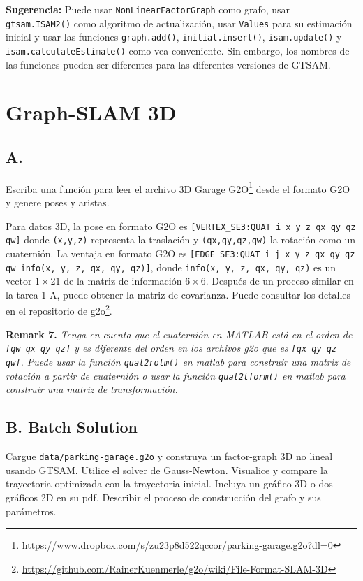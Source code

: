 \documentclass[tp]{lcc}
\begin{document}
\textbf{Sugerencia:} Puede usar \lstinline[style=bash]{NonLinearFactorGraph} como grafo, usar \lstinline[style=bash]{gtsam.ISAM2()} como algoritmo de actualización, usar \lstinline[style=bash]{Values} para su estimación inicial y usar las funciones \lstinline[style=bash]{graph.add()}, \lstinline[style=bash]{initial.insert()}, \lstinline[style=bash]{isam.update()} y \lstinline[style=bash]{isam.calculateEstimate()} como vea conveniente. Sin embargo, los nombres de las funciones pueden ser diferentes para las diferentes versiones de GTSAM.

\section{Graph-SLAM 3D}
\subsection{A.}
Escriba una función para leer el archivo 3D Garage G2O\footnote{\url{https://www.dropbox.com/s/zu23p8d522qccor/parking-garage.g2o?dl=0}} desde el formato G2O y genere poses y aristas.

Para datos 3D, la pose en formato G2O es \lstinline[style=bash]{[VERTEX_SE3:QUAT i x y z qx qy qz qw]} donde \lstinline[style=bash]{(x,y,z)} representa la traslación y \lstinline[style=bash]{(qx,qy,qz,qw)} la rotación como un cuaternión. La ventaja en formato G2O es \lstinline[style=bash]{[EDGE_SE3:QUAT i j x y z qx qy qz qw info(x, y, z, qx, qy, qz)]}, donde \lstinline[style=bash]{info(x, y, z, qx, qy, qz)} es un vector $1 \times 21$ de la matriz de información $6 \times 6$. Después de un proceso similar en la tarea 1 A, puede obtener la matriz de covarianza. Puede consultar los detalles en el repositorio de g2o\footnote{\url{https://github.com/RainerKuenmerle/g2o/wiki/File-Format-SLAM-3D}}.

\textbf{Remark 7.} \textit{Tenga en cuenta que el cuaternión en MATLAB está en el orden de \lstinline[style=bash]{[qw qx qy qz]} y es diferente del orden en los archivos g2o que es \lstinline[style=bash]{[qx qy qz qw]}. Puede usar la función \lstinline[style=bash]{quat2rotm()} en matlab para construir una matriz de rotación a partir de cuaternión o usar la función \lstinline[style=bash]{quat2tform()} en matlab para construir una matriz de transformación.}

\subsection{B. Batch Solution}
Cargue \lstinline[style=bash]{data/parking-garage.g2o} y construya un factor-graph 3D no lineal usando GTSAM. Utilice el solver de Gauss-Newton. Visualice y compare la trayectoria optimizada con la trayectoria inicial. Incluya un gráfico 3D o dos gráficos 2D en su pdf. Describir el proceso de construcción del grafo y sus parámetros.
\end{document}
